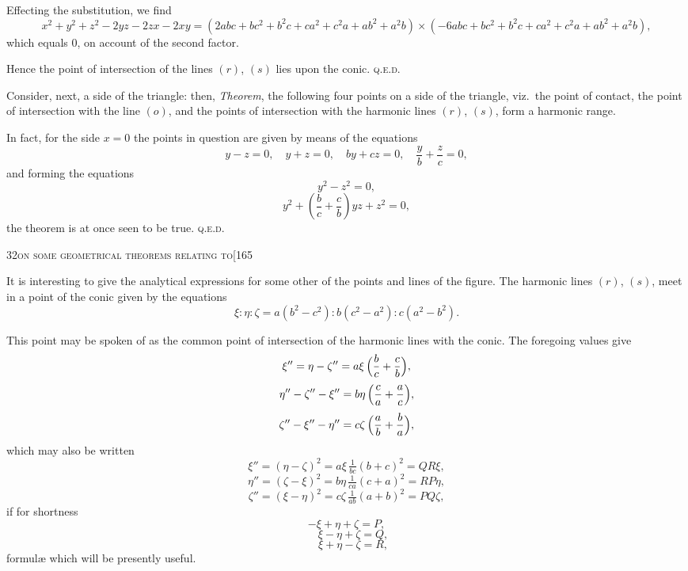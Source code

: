 \documentclass[11pt]{article}
\begin{document}
Effecting the substitution, we find
\[
x^{2} + y^{2} + z^{2} - 2yz - 2zx - 2xy = (2abc + bc^{2} + b^{2}c + ca^{2} + c^{2}a + ab^{2} + a^{2}b)
\times (-6abc + bc^{2} + b^{2}c + ca^{2} + c^{2}a + ab^{2} + a^{2}b),
\]
which equals 0, on account of the second factor.

Hence the point of intersection of the lines $(r)$, $(s)$ lies upon the conic. \textsc{q.e.d.}

Consider, next, a side of the triangle: then, \textit{Theorem}, the following four points
on a side of the triangle, viz.\ the point of contact, the point of intersection with
the line $(o)$, and the points of intersection with the harmonic lines $(r)$, $(s)$, form a
harmonic range.

In fact, for the side $x = 0$ the points in question are given by means of the
equations
\[
y - z = 0,\quad y + z = 0,\quad by + cz = 0,\quad \frac{y}{b} + \frac{z}{c} = 0,
\]
and forming the equations
\[
y^{2} - z^{2} = 0,
\]
\[
y^{2} + \left(\frac{b}{c} + \frac{c}{b}\right) yz + z^{2} = 0,
\]
the theorem is at once seen to be true. \textsc{q.e.d.}

\newpage

\begin{center}
\small\textsc{32}\hfill\textsc{on some geometrical theorems relating to}\hfill[165
\end{center}

\medskip

\noindent It is interesting to give the analytical expressions for some other of the points
and lines of the figure. The harmonic lines $(r)$, $(s)$, meet in a point of the conic
given by the equations
\[
\xi : \eta : \zeta = a(b^{2} - c^{2}) : b(c^{2} - a^{2}) : c(a^{2} - b^{2}).
\]

This point may be spoken of as the common point of intersection of the harmonic
lines with the conic. The foregoing values give
\[
\xi'' = \eta - \zeta'' = a\xi\,\Bigl(\frac{b}{c} + \frac{c}{b}\Bigr),
\]
\[
\eta'' - \zeta'' - \xi'' = b\eta\,\Bigl(\frac{c}{a} + \frac{a}{c}\Bigr),
\]
\[
\zeta'' - \xi'' - \eta'' = c\zeta\,\Bigl(\frac{a}{b} + \frac{b}{a}\Bigr),
\]
which may also be written
\[
\xi'' = (\eta - \zeta)^{2} = a\xi\,\tfrac{1}{bc}(b+c)^{2} = Q R \xi,
\]
\[
\eta'' = (\zeta - \xi)^{2} = b\eta\,\tfrac{1}{ca}(c+a)^{2} = R P \eta,
\]
\[
\zeta'' = (\xi - \eta)^{2} = c\zeta\,\tfrac{1}{ab}(a+b)^{2} = P Q \zeta,
\]
if for shortness
\[
- \xi + \eta + \zeta = P,
\]
\[
\phantom{-}\xi - \eta + \zeta = Q,
\]
\[
\phantom{-}\xi + \eta - \zeta = R,
\]
formul\ae{} which will be presently useful.
\end{document}
